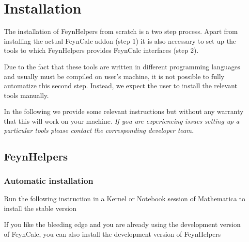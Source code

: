 \documentclass[../FeynHelpersManual.tex]{subfiles}
\begin{document}
\hypertarget{installation}{
\section{Installation}\label{installation}}

The installation of FeynHelpers from scratch is a two step process.
Apart from installing the actual FeynCalc addon (step 1) it is also
necessary to set up the tools to which FeynHelpers provides FeynCalc
interfaces (step 2).

Due to the fact that these tools are written in different programming
languages and usually must be compiled on user's machine, it is not
possible to fully automatize this second step. Instead, we expect the
user to install the relevant tools manually.

In the following we provide some relevant instructions but without any
warranty that this will work on your machine. \emph{If you are
experiencing issues setting up a particular tools please contact the
corresponding developer team.}

\hypertarget{feynhelpers}{%
\subsection{FeynHelpers}\label{feynhelpers}}

\hypertarget{automatic-installation}{%
\subsubsection{Automatic installation}\label{automatic-installation}}

Run the following instruction in a Kernel or Notebook session of
Mathematica to install the stable version

\begin{Shaded}
\begin{Highlighting}[]
\OperatorTok{[}\OperatorTok{]}
\OperatorTok{[]}
\end{Highlighting}
\end{Shaded}

If you like the bleeding edge and you are already using the development
version of FeynCalc, you can also install the development version of
FeynHelpers

\begin{Shaded}
\begin{Highlighting}[]
\OperatorTok{[}\OperatorTok{]}
\OperatorTok{[}\OtherTok{{-}\textgreater{}}\OperatorTok{]}
\end{Highlighting}
\end{Shaded}
\end{document}
